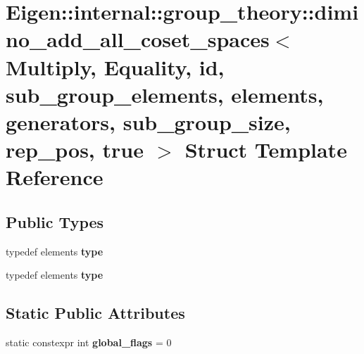 \hypertarget{struct_eigen_1_1internal_1_1group__theory_1_1dimino__add__all__coset__spaces_3_01_multiply_00_014e1e7100a33430204d5dd7c50ace3f17}{}\section{Eigen\+:\+:internal\+:\+:group\+\_\+theory\+:\+:dimino\+\_\+add\+\_\+all\+\_\+coset\+\_\+spaces$<$ Multiply, Equality, id, sub\+\_\+group\+\_\+elements, elements, generators, sub\+\_\+group\+\_\+size, rep\+\_\+pos, true $>$ Struct Template Reference}
\label{struct_eigen_1_1internal_1_1group__theory_1_1dimino__add__all__coset__spaces_3_01_multiply_00_014e1e7100a33430204d5dd7c50ace3f17}
\subsection*{Public Types}
\begin{DoxyCompactItemize}
\item 
\mbox{\label{struct_eigen_1_1internal_1_1group__theory_1_1dimino__add__all__coset__spaces_3_01_multiply_00_014e1e7100a33430204d5dd7c50ace3f17_af5b3088c8ddc0e77d1a0b9c0d8d5df0a}} 
typedef elements {\bfseries type}
\item 
\mbox{\label{struct_eigen_1_1internal_1_1group__theory_1_1dimino__add__all__coset__spaces_3_01_multiply_00_014e1e7100a33430204d5dd7c50ace3f17_af5b3088c8ddc0e77d1a0b9c0d8d5df0a}} 
typedef elements {\bfseries type}
\end{DoxyCompactItemize}
\subsection*{Static Public Attributes}
\begin{DoxyCompactItemize}
\item 
\mbox{\label{struct_eigen_1_1internal_1_1group__theory_1_1dimino__add__all__coset__spaces_3_01_multiply_00_014e1e7100a33430204d5dd7c50ace3f17_ad510646d4820991318ea62be7040b3db}} 
static constexpr int {\bfseries global\+\_\+flags} = 0
\end{DoxyCompactItemize}


